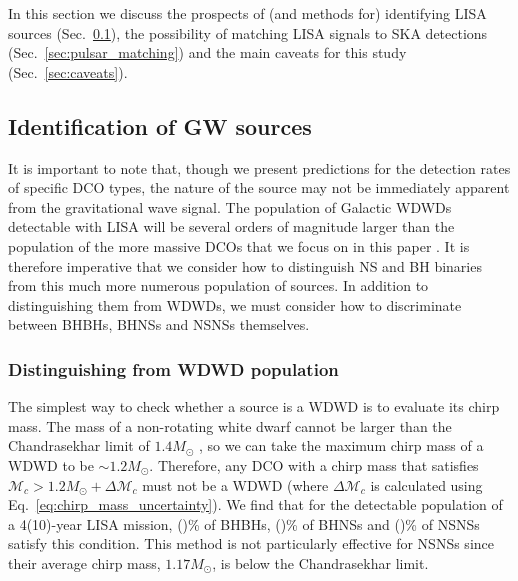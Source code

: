 In this section we discuss the prospects of (and methods for) identifying LISA sources (Sec.~\ref{sec:identify_sources}), the possibility of matching LISA signals to SKA detections (Sec.~\ref{sec:pulsar_matching}) and the main caveats for this study (Sec.~\ref{sec:caveats}).

\subsection{Identification of GW sources}\label{sec:identify_sources}
It is important to note that, though we present predictions for the detection rates of specific DCO types, the nature of the source may not be immediately apparent from the gravitational wave signal. The population of Galactic WDWDs detectable with LISA will be several orders of magnitude larger than the population of the more massive DCOs that we focus on in this paper \citep[e.g.][]{Korol+2017}. It is therefore imperative that we consider how to distinguish NS and BH binaries from this much more numerous population of sources. In addition to distinguishing them from WDWDs, we must consider how to discriminate between BHBHs, BHNSs and NSNSs themselves.

\subsubsection{Distinguishing from WDWD population}\label{sec:WDWD_distinguish}
The simplest way to check whether a source is a WDWD is to evaluate its chirp mass. The mass of a non-rotating white dwarf cannot be larger than the Chandrasekhar limit of $1.4 \unit{M_\odot}$ \citep{Chandrasekhar+1931, Hamada+1961}, so we can take the maximum chirp mass of a WDWD to be $\sim 1.2 \unit{M_{\odot}}$. Therefore, any DCO with a chirp mass that satisfies $\mathcal{M}_c > 1.2 \unit{M_{\odot}} + \Delta \mathcal{M}_c$ must not be a WDWD (where $\Delta \mathcal{M}_c$ is calculated using Eq.~\ref{eq:chirp_mass_uncertainty}). We find that for the detectable population of a 4(10)-year LISA mission, \BHBHAboveMaxWDWDFourPerc{}(\BHBHAboveMaxWDWDTenPerc{})\% of BHBHs, \BHNSAboveMaxWDWDFourPerc{}(\BHNSAboveMaxWDWDTenPerc{})\% of BHNSs and \NSNSAboveMaxWDWDFourPerc{}(\NSNSAboveMaxWDWDTenPerc{})\% of NSNSs satisfy this condition. This method is not particularly effective for NSNSs since their average chirp mass, $1.17 \unit{M_\odot}$, is below the Chandrasekhar limit.

